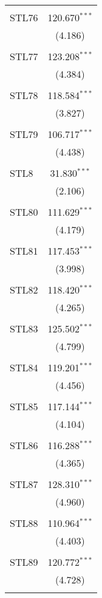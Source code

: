 \begin{table}[!htbp]
\begin{tabular}{@{\extracolsep{5pt}}lc}
  & \\ 
 STL76 & 120.670$^{***}$ \\ 
  & (4.186) \\ 
  & \\ 
 STL77 & 123.208$^{***}$ \\ 
  & (4.384) \\ 
  & \\ 
 STL78 & 118.584$^{***}$ \\ 
  & (3.827) \\ 
  & \\ 
 STL79 & 106.717$^{***}$ \\ 
  & (4.438) \\ 
  & \\ 
 STL8 & 31.830$^{***}$ \\ 
  & (2.106) \\ 
  & \\ 
 STL80 & 111.629$^{***}$ \\ 
  & (4.179) \\ 
  & \\ 
 STL81 & 117.453$^{***}$ \\ 
  & (3.998) \\ 
  & \\ 
 STL82 & 118.420$^{***}$ \\ 
  & (4.265) \\ 
  & \\ 
 STL83 & 125.502$^{***}$ \\ 
  & (4.799) \\ 
  & \\ 
 STL84 & 119.201$^{***}$ \\ 
  & (4.456) \\ 
  & \\ 
 STL85 & 117.144$^{***}$ \\ 
  & (4.104) \\ 
  & \\ 
 STL86 & 116.288$^{***}$ \\ 
  & (4.365) \\ 
  & \\ 
 STL87 & 128.310$^{***}$ \\ 
  & (4.960) \\ 
  & \\ 
 STL88 & 110.964$^{***}$ \\ 
  & (4.403) \\ 
  & \\ 
 STL89 & 120.772$^{***}$ \\ 
  & (4.728) \\ 
  & \\ 

\end{tabular}
\end{table}
